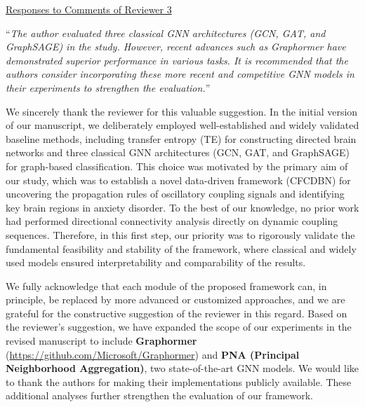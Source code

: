 \documentclass[12pt,technote,onecolumn]{IEEEtran}
\begin{document}
\newpage
\clearpage
\begin{center}
\underline{Responses to Comments of Reviewer 3}
\end{center}

\vspace{4mm} %
 ``{\it The author evaluated three classical GNN architectures (GCN, GAT, and GraphSAGE) in the study. However, recent advances such as Graphormer have demonstrated superior performance in various tasks. It is recommended that the authors consider incorporating these more recent and competitive GNN models in their experiments to strengthen the evaluation.}''
\vspace{1mm}  %


We sincerely thank the reviewer for this valuable suggestion. In the initial version of our manuscript, we deliberately employed well-established and widely validated baseline methods, including transfer entropy (TE) for constructing directed brain networks and three classical GNN architectures (GCN, GAT, and GraphSAGE) for graph-based classification. This choice was motivated by the primary aim of our study, which was to establish a novel data-driven framework (CFCDBN) for uncovering the propagation rules of oscillatory coupling signals and identifying key brain regions in anxiety disorder. To the best of our knowledge, no prior work had performed directional connectivity analysis directly on dynamic coupling sequences. Therefore, in this first step, our priority was to rigorously validate the fundamental feasibility and stability of the framework, where classical and widely used models ensured interpretability and comparability of the results.

We fully acknowledge that each module of the proposed framework can, in principle, be replaced by more advanced or customized approaches, and we are grateful for the constructive suggestion of the reviewer in this regard. Based on the reviewer's suggestion, we have expanded the scope of our experiments in the revised manuscript to include \textbf{Graphormer} (\url{https://github.com/Microsoft/Graphormer})\cite{shi2022benchmarking,ying2021do} and \textbf{PNA (Principal Neighborhood Aggregation)}\cite{corso2020principal}, two state-of-the-art GNN models. We would like to thank the authors for making their implementations publicly available. These additional analyses further strengthen the evaluation of our framework. 
\end{document}
